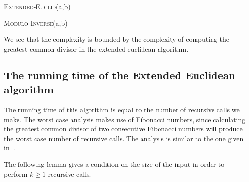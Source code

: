 \documentclass[a4paper,oneside,article,11pt]{memoir}
\begin{document}
\begin{algorithm}[H]
\caption{\textsc{Extended-Euclid}(a,b)}
\label{alg:extended_euclidean}
\begin{algorithmic}[1]
\ELSE
\ENDIF
\end{algorithmic}
\end{algorithm}

\begin{algorithm}[H]
\caption{\textsc{Modulo Inverse}(a,b)}
\label{alg:modinv}
\begin{algorithmic}[1]
\ELSE
\ENDIF
\end{algorithmic}
\end{algorithm}

We see that the complexity is bounded by the complexity of computing the greatest common divisor in the extended euclidean algorithm.

\subsection{The running time of the Extended Euclidean algorithm}
The running time of this algorithm is equal to the number of recursive calls we make. The worst case analysis makes use of Fibonacci numbers, since calculating the greatest common divisor of two consecutive Fibonacci numbers will produce the worst case number of recursive calls.
The analysis is similar to the one given in~\cite[p.~935-937]{clrs}.

The following lemma gives a condition on the size of the input in order to perform $k \geq 1$ recursive calls.
\end{document}
